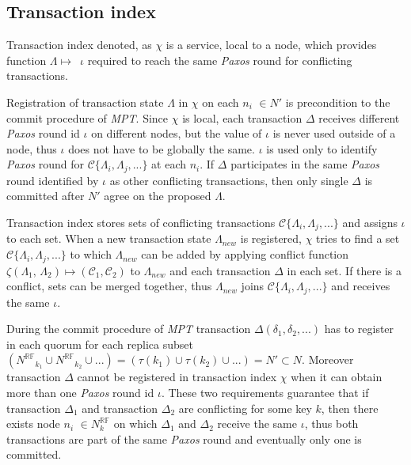 \documentclass[runningheads,a4paper]{llncs}
\newcommand{\nodesTx}{$\mathit{N'}$\xspace}
\newcommand{\transaction}{$\Delta$\xspace}
\newcommand{\txOne}{$\Delta_{1}$\xspace}
\newcommand{\txTwo}{$\Delta_{2}$\xspace}
\newcommand{\txStateM}{$\Lambda_{new}$\xspace}
\newcommand{\txStates}{$\{\Lambda_{i}, \Lambda_{j}, ...\}$\xspace}
\newcommand{\conflictFunction}{$\zeta (\text{\txStateOne, \txStateTwo}) \mapsto ( \mathcal{C}_1, \mathcal{C}_2)$\xspace}
\newcommand{\conflictingTxSet}{$\mathcal{C}\text{\txStates}$\xspace}
\newcommand{\NRF}{\mathit{N^{\mathbb{RF}}}}
\newcommand{\topology}{$\tau$\xspace}
\newcommand{\topologyItem}[2]{$\tau(\text{\txItemi{#1}})) \mapsto \mathit{#2}$}
\newcommand{\paxosRoundId}{$\iota$\xspace}
\newcommand{\transactionFull}{$\Delta(\delta_{1}, \delta_{2}, ...)$\xspace}
\newcommand{\txItem}{$\lambda$\xspace}
\newcommand{\txItemi}[1]{$\lambda_{#1}$\xspace}
\newcommand{\txState}{$\Lambda$\xspace}
\newcommand{\txStatei}[1]{$\Lambda_{#1}$\xspace}
\newcommand{\txStateOne}{$\Lambda_1$\xspace}
\newcommand{\txStateTwo}{$\Lambda_2$\xspace}
\newcommand{\txIndex}{$\chi$\xspace}
\newcommand{\paxos}{\emph{Paxos}\xspace}
\newcommand{\mpt}{\emph{MPT}\xspace}
\newcommand{\RF}[1]{\emph{$\mathbb{RF}=#1$}\xspace}
\newcommand{\RFaloneInMath}{\mathbb{RF}}
\newcommand{\node}[1]{$n_{#1}$\xspace}
\begin{document}
\subsection{Transaction index}

Transaction index denoted, as \txIndex is a service, local to a node, which provides function \mbox{\txState $\mapsto $ \paxosRoundId} required to reach the same \paxos round for conflicting transactions.

Registration of transaction state \txState in \txIndex on each \node{i} $\in$\nodesTx is precondition to the commit procedure of \mpt. Since \txIndex is local, each transaction \transaction receives different \paxos round id \paxosRoundId on different nodes, but the value of \paxosRoundId is never used outside of a node, thus \paxosRoundId does not have to be globally the same. \paxosRoundId is used only to identify \paxos round for \conflictingTxSet at each \node{i}. If \transaction participates in the same \paxos round identified by \paxosRoundId as other conflicting transactions, then only single \transaction is committed after \nodesTx agree on the proposed \txState.

Transaction index stores sets of conflicting transactions \conflictingTxSet and assigns \paxosRoundId to each set. When a new transaction state \txStateM is registered, \txIndex tries to find a set \conflictingTxSet to which \txStateM can be added by applying conflict function \conflictFunction to \txStateM and each transaction \transaction in each set. If there is a conflict, sets can be merged together, thus \txStateM joins \conflictingTxSet and receives the same \paxosRoundId. 

During the commit procedure of \mpt transaction \transactionFull has to register in each quorum for each replica subset $(\NRF_{k_1} \cup \NRF_{k_2} \cup ... ) = (\tau(k_1) \cup \tau(k_2) \cup ... ) = \text{\nodesTx}\subset\mathit{N}$. Moreover transaction \transaction cannot be registered in transaction index \txIndex when it can obtain more than one \paxos round id \paxosRoundId. These two requirements guarantee that if transaction \txOne and transaction \txTwo are conflicting for some key $k$, then there exists node \node{i} $\in N^{\RFaloneInMath}_{k}$ on which \txOne and \txTwo receive the same \paxosRoundId, thus both transactions are part of the same \paxos round and eventually only one is committed.

\end{document}
